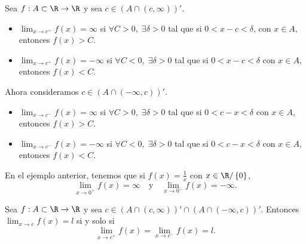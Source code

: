 \begin{fdefinition}[]
\normalfont Sea $\displaystyle f : A\subset\R \to \R $ y sea $\displaystyle c \in \left(A \cap \left(c, \infty\right)\right)' $. 
\begin{itemize}
\item $\displaystyle \lim_{x \to c^{+}}f\left(x\right) = \infty $ si $\displaystyle \forall C > 0, \; \exists \delta > 0 $ tal que si $\displaystyle 0 < x- c < \delta  $, con $\displaystyle x\in A $, entonces $\displaystyle f\left(x\right) > C $.
\item $\displaystyle \lim_{x \to c^{+}}f\left(x\right) = -\infty $ si $\displaystyle \forall C < 0, \; \exists \delta > 0 $ tal que si $\displaystyle 0 < x - c< \delta  $ con $\displaystyle x \in A $, entonces $\displaystyle f\left(x\right) < C $.
\end{itemize}
Ahora consideramos $\displaystyle c \in \left(A \cap \left(-\infty, c\right)\right)' $.
\begin{itemize}
\item $\displaystyle \lim_{x \to c^{-}}f\left(x\right) = \infty $ si $\displaystyle \forall C > 0, \; \exists \delta > 0 $ tal que si $\displaystyle 0 < c - x < \delta  $ con $\displaystyle x \in A $, entonces $\displaystyle f\left(x\right) > C $.
\item $\displaystyle \lim_{x \to c^{-}}f\left(x\right) = -\infty $ si $\displaystyle \forall C<0, \; \exists \delta > 0 $ tal que si $\displaystyle 0 < c - x < \delta  $ con $\displaystyle x \in A $, entonces $\displaystyle f\left(x\right) < C $. 
\end{itemize}
\end{fdefinition}

\begin{eg}
\normalfont En el ejemplo anterior, tenemos que si $\displaystyle f\left(x\right) = \frac{1}{x} $ con $\displaystyle x \in \R / \left\{ 0\right\} $, 
\[\lim_{x \to 0^{+}}f\left(x\right) = \infty \quad \text{y} \quad \lim_{x \to 0^{-}}f\left(x\right) = - \infty .\]
\end{eg}

\begin{ftheorem}[]
\normalfont Sea $\displaystyle f: A \subset \R \to \R $ y sea $\displaystyle c \in \left(A \cap \left(c, \infty\right)\right)'\cap\left(A \cap \left(-\infty, c\right)\right)' $. Entonces $\displaystyle \lim_{x \to c}f\left(x\right) = l $ si  y solo si 
\[\lim_{x \to c^{+}}f\left(x\right) = \lim_{x \to c^{-}}f\left(x\right) = l .\]
\end{ftheorem}

